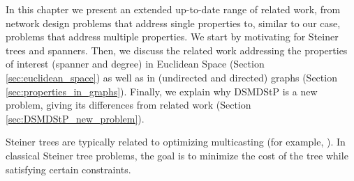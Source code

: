 \label{sec:related}
\acresetall

In this chapter we present an extended up-to-date range of related work, from network design problems that address single properties to, similar to our case, 
problems that address multiple properties. We start by motivating for Steiner trees and spanners. Then, we discuss the related work addressing the properties of interest (spanner and degree) in 
Euclidean Space (Section \ref{sec:euclidean_space}) as well as in (undirected and directed) graphs (Section \ref{sec:properties_in_graphs}). Finally, we explain why DSMDStP 
is a new problem, giving its differences from related work (Section \ref{sec:DSMDStP_new_problem}).

Steiner trees are typically related to optimizing multicasting (for example, \linebreak 
\cite{Sun1995,Raghavan1998,Feng1999,Parsa1998,Zhengying2001,Wang2009,Wang2005,Chen2004}). 
In classical Steiner tree problems, the goal is to minimize the cost of the tree while satisfying certain constraints.

